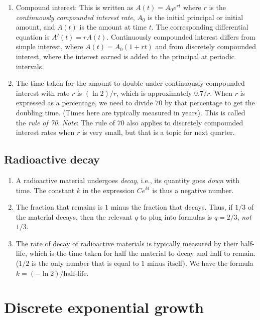 \documentclass{amsart}
\begin{document}
\begin{enumerate}
\item Compound interest: This is written as $A(t) = A_0 e^{rt}$ where
  $r$ is the {\em continuously compounded interest rate}, $A_0$ is the
  initial principal or initial amount, and $A(t)$ is the amount at
  time $t$. The corresponding differential equation is $A'(t) =
  rA(t)$. Continuously compounded interest differs from simple interest,
  where $A(t) = A_0(1 + rt)$ and from discretely compounded interest,
  where the interest earned is added to the principal at periodic
  intervals.
\item The time taken for the amount to double under continuously
  compounded interest with rate $r$ is $(\ln 2)/r$, which is
  approximately $0.7/r$. When $r$ is expressed as a percentage, we
  need to divide $70$ by that percentage to get the doubling
  time. (Times here are typically measured in years). This is called
  the {\em rule of 70}. {\em Note}: The rule of 70 also applies to
  discretely compounded interest rates when $r$ is very small, but
  that is a topic for next quarter.
\end{enumerate}


\subsection{Radioactive decay}

\begin{enumerate}
\item A radioactive material undergoes {\em decay}, i.e., its quantity
  goes {\em down} with time. The constant $k$ in the expression
  $Ce^{kt}$ is thus a negative number.
\item The fraction that remains is $1$ minus the fraction that
  decays. Thus, if $1/3$ of the material decays, then the relevant $q$
  to plug into formulas is $q = 2/3$, {\em not} $1/3$.
\item The rate of decay of radioactive materials is typically measured
  by their half-life, which is the time taken for half the material to
  decay and half to remain. ($1/2$ is the only number that is equal to
  $1$ minus itself). We have the formula $k = (-\ln
  2)/\text{half-life}$.
\end{enumerate}

\section{Discrete exponential growth}
\end{document}
